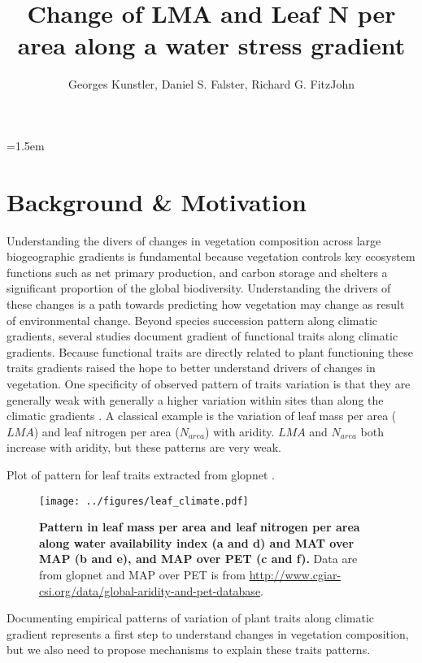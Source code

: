 \documentclass[a4paper,11pt]{article}
\title{Change of LMA and Leaf N per area along a water stress gradient}
\author{Georges Kunstler, Daniel S. Falster, Richard G. FitzJohn}
\date{}
\affiliation{Irstea, Grenoble, France and Department of Biological Sciences, Macquarie University,
  Sydney, Australia}
\date{}
\begin{document}
\mstitleshort
\parindent=1.5em
\addtolength{\parskip}{.3em}


\section{Background \& Motivation}

Understanding the divers of changes in vegetation composition across large biogeographic gradients is fundamental because vegetation controls key ecosystem functions such as net primary production, and carbon storage and shelters a significant proportion of the global biodiversity. Understanding the drivers of these changes is a path towards predicting how vegetation may change as result of environmental change. Beyond species succession pattern along climatic gradients, several
studies document gradient of functional traits along climatic
gradients. Because functional traits are directly related to plant functioning these traits gradients raised the hope to better understand drivers of changes in vegetation. One specificity of observed pattern of traits variation is
that they are generally weak with generally a higher variation within
sites than along the climatic gradients \citep[see][]{Wright-2004}. A
classical example is the variation of leaf mass per area ($LMA$) and
leaf nitrogen per area ($N_{area}$) with aridity. $LMA$
\citep{Wright-2004,Onoda-2011,Moles-2014} and $N_{area}$
\citep{Wright-2005,Maire-2015} both increase with aridity, but these
patterns are very weak.


Plot of pattern for leaf traits extracted from glopnet \citep{Wright-2004}.

\begin{figure}[ht]
\centering
\texttt{[image: ../figures/leaf\_climate.pdf]}
\caption{\textbf{Pattern in leaf mass per area and leaf nitrogen per area along water availability index (a and d) and MAT over MAP (b and e), and MAP over PET (c and f).} Data are from glopnet \citep{Wright-2004} and MAP over PET is from \url{http://www.cgiar-csi.org/data/global-aridity-and-pet-database}.
\label{fig:leafpattern}}
\end{figure}

Documenting empirical patterns of variation of plant traits along
climatic gradient represents a first step to understand changes in
vegetation composition, but we also need to propose mechanisms to
explain these traits patterns. 
\end{document}
